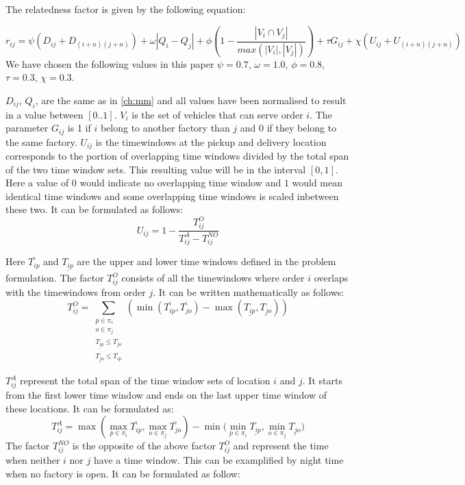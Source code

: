\documentclass[../main.tex]{subfiles}
\begin{document}
The relatedness factor is given by the following equation:

\begin{equation}
\label{relatedness}
    r_{ij} = \psi ( D_{i j} + D_{(i+n)(j+n)}) + \omega|Q_i - Q_j|
    + \phi (1-\dfrac{|V_i\cap V_j|}{max(|V_i|, |V_j|)} ) + \tau G_{ij} + \chi (U_{ij} + U_{(i+n)(j+n)})
\end{equation}
We have chosen the following values in this paper $\psi=0.7$, $\omega=1.0$, $\phi=0.8$, $\tau=0.3$, $\chi = 0.3$. \par

$D_{ij}$, $Q_i$, are the same as in \cref{ch:mm} and all values have been normalised to result in a value between $[0..1]$. 
$V_i$ is the set of vehicles that can serve order $i$. 
The parameter $G_{ij}$ is 1 if $i$ belong to another factory than $j$ and 0 if they belong to the same factory. 
$U_{ij}$ is the timewindows at the pickup and delivery location corresponds to the portion of overlapping time windows divided by the total span of the two time window sets. 
This resulting value will be in the interval $[0,1]$. 
Here a value of $0$ would indicate no overlapping time window and $1$ would mean identical time windows and some overlapping time windows is scaled inbetween these two.
It can be formulated as follows:
\begin{equation}
    U_{ij} = 1 - 
    \dfrac{T^O_{ij}}
    {T^A_{ij} -  T^{NO}_{ij} }
    \label{eq:overlaptime}
\end{equation}

Here $\overline{T_{ip}}$ and $\underline{T_{ip}}$ are the upper and lower time windows defined in the problem formulation.
The factor $T^O_{ij}$ consists of all the timewindows where order $i$ overlaps with the timewindows from order $j$. It can be written mathematically as follows:
\begin{equation}\label{eq:ot}
    T^O_{ij}=\sum\limits_{\substack{p\in \pi_i\\ o\in \pi_j\\ \underline{T_{ip}}\leq \overline{T_{jo}}\\ \underline{T_{jo}}\leq\overline{T_{ip}}}} (\min(\overline{T_{ip}}, \overline{T_{jo}}) - \max(\underline{T_{ip}},\underline{T_{jo}}) )
\end{equation}

$T^A_{ij}$ represent the total span of the time window sets of location $i$ and $j$. 
It starts from the first lower time window and ends on the last upper time window of these locations. It can be formulated as:  
\begin{equation}
    T^A_{ij} = \max{(\max\limits_{p\in \pi_i} \overline{T_{ip}}, \max\limits_{o\in \pi_j} \overline{T_{jo}})} - 
    \min{(\min\limits_{p\in \pi_i} \underline{T_{ip}}, \min\limits_{o\in \pi_j} \underline{T_{jo}}})
    \label{eq:a}
\end{equation}
The factor $T^{NO}_{ij}$ is the opposite of the above factor $T^O_{ij}$ and represent the time when neither $i$ nor $j$ have a time window. This can be examplified by night time when no factory is open. It can be formulated as follow:
\end{document}
